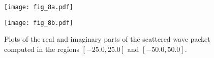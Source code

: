 \documentclass[aps,prc,reprint,noshowpacs,groupedaddress,onecolumn]{revtex4}
\begin{document}
\begin{figure}
\caption{Plots of the real and imaginary parts of the scattered wave packet
computed in the regions $[-25.0,25.0]$ and $[-50.0,50.0]$.}
\begin{minipage}[t]{.45\linewidth}
\centering
\texttt{[image: fig\_8a.pdf]}
\end{minipage}
\begin{minipage}[t]{.45\linewidth}
\centering
\texttt{[image: fig\_8b.pdf]}
\end{minipage}
\label{figure 8}
\end{figure}
\end{document}
